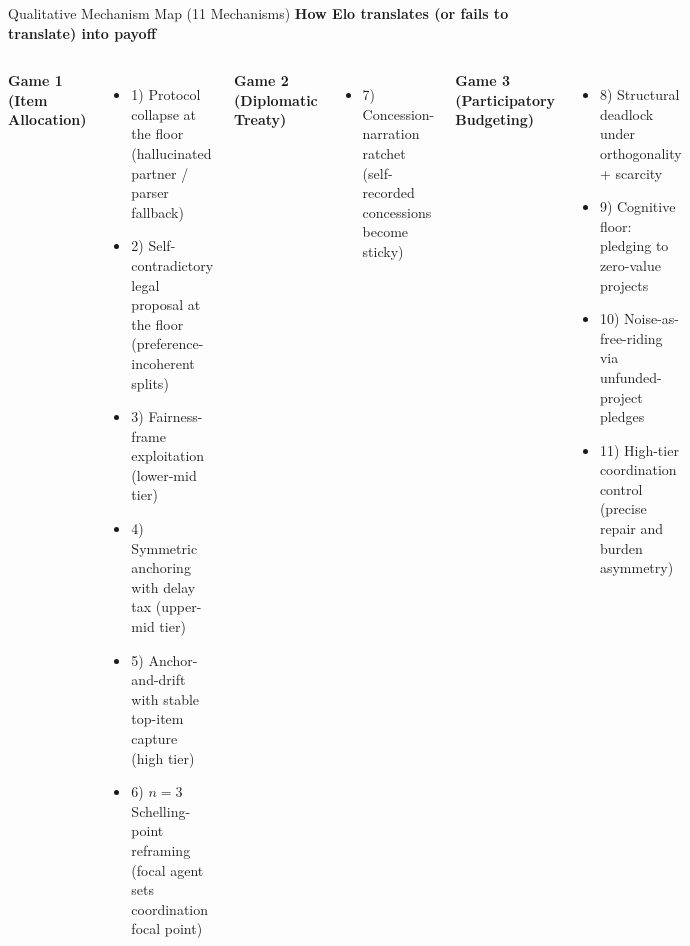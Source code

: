 \documentclass[aspectratio=169]{beamer}
\begin{document}
\begin{frame}{Qualitative Mechanism Map (11 Mechanisms)}
\scriptsize
\textbf{How Elo translates (or fails to translate) into payoff}

\begin{columns}[t,onlytextwidth]
\textbf{Game 1 (Item Allocation)}
\begin{itemize}
    \item 1) Protocol collapse at the floor (hallucinated partner / parser fallback)
    \item 2) Self-contradictory legal proposal at the floor (preference-incoherent splits)
    \item 3) Fairness-frame exploitation (lower-mid tier)
    \item 4) Symmetric anchoring with delay tax (upper-mid tier)
    \item 5) Anchor-and-drift with stable top-item capture (high tier)
    \item 6) $n=3$ Schelling-point reframing (focal agent sets coordination focal point)
\end{itemize}

\textbf{Game 2 (Diplomatic Treaty)}
\begin{itemize}
    \item 7) Concession-narration ratchet (self-recorded concessions become sticky)
\end{itemize}

\textbf{Game 3 (Participatory Budgeting)}
\begin{itemize}
    \item 8) Structural deadlock under orthogonality + scarcity
    \item 9) Cognitive floor: pledging to zero-value projects
    \item 10) Noise-as-free-riding via unfunded-project pledges
    \item 11) High-tier coordination control (precise repair and burden asymmetry)
\end{itemize}
\end{columns}
\end{frame}
\end{document}

